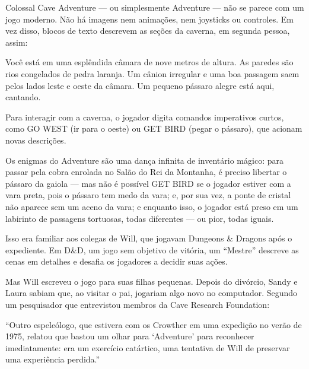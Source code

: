 \documentclass[12pt,a4paper]{article}
\begin{document}
Colossal Cave Adventure — ou simplesmente Adventure —
não se parece com um jogo moderno.
Não há imagens nem animações, nem joysticks ou controles.
Em vez disso, blocos de texto descrevem as seções da caverna, em segunda pessoa, assim:

Você está em uma esplêndida câmara de nove metros de altura.
As paredes são rios congelados de pedra laranja.
Um cânion irregular e uma boa passagem saem pelos lados leste e oeste da câmara.
Um pequeno pássaro alegre está aqui, cantando.

Para interagir com a caverna, o jogador digita comandos imperativos curtos, como
GO WEST (ir para o oeste) ou GET BIRD (pegar o pássaro),
que acionam novas descrições.

Os enigmas do Adventure são uma dança infinita de inventário mágico:
para passar pela cobra enrolada no Salão do Rei da Montanha, é preciso libertar o pássaro da gaiola —
mas não é possível GET BIRD se o jogador estiver com a vara preta, pois o pássaro tem medo da vara;
e, por sua vez, a ponte de cristal não aparece sem um aceno da vara;
e enquanto isso, o jogador está preso em um labirinto de passagens tortuosas,
todas diferentes — ou pior, todas iguais.

Isso era familiar aos colegas de Will, que jogavam Dungeons & Dragons após o expediente.
Em D&D, um jogo sem objetivo de vitória, um “Mestre” descreve as cenas em detalhes e desafia os jogadores a decidir suas ações.

Mas Will escreveu o jogo para suas filhas pequenas.
Depois do divórcio, Sandy e Laura sabiam que, ao visitar o pai, jogariam algo novo no computador.
Segundo um pesquisador que entrevistou membros da Cave Research Foundation:

“Outro espeleólogo, que estivera com os Crowther em uma expedição no verão de 1975, relatou que bastou um olhar para ‘Adventure’ para reconhecer imediatamente:
era um exercício catártico, uma tentativa de Will de preservar uma experiência perdida.”

\printbibliography
\end{document}
